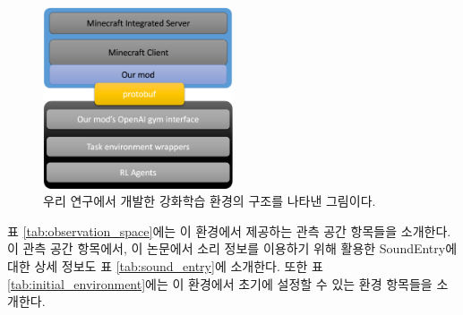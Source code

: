 \documentclass[oneside, under, ko]{snuthesis}
\begin{document}
\begin{figure}
    \centering
    \includegraphics[width=0.5\textwidth]{environment.png}
    \caption{우리 연구에서 개발한 강화학습 환경의 구조를 나타낸 그림이다.}
    \label{fig:environment}
\end{figure}

표 \ref{tab:observation_space}에는 이 환경에서 제공하는 관측 공간 항목들을 소개한다. 이 관측 공간 항목에서, 이 논문에서 소리 정보를 이용하기 위해 활용한 SoundEntry에 대한 상세 정보도 표 \ref{tab:sound_entry}에 소개한다. 또한 표 \ref{tab:initial_environment}에는 이 환경에서 초기에 설정할 수 있는 환경 항목들을 소개한다.
\end{document}
